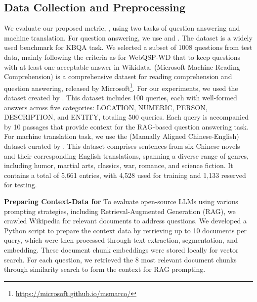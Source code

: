 \label{sub:data-col-pre}
\subsection{Data Collection and Preprocessing}
\label{sec:data}
We evaluate our proposed metric, \rap, using two tasks of question answering and machine translation. For question answering, we use \webqsp and \ms. The \textbf{\webqsp} dataset \cite{yih2016value} is a widely used benchmark for KBQA task. We selected a subset of 1008 questions from test data, mainly following the criteria as for WebQSP-WD \cite{C18-1280} that to keep questions with at least one acceptable answer in Wikidata. 
\textbf{\ms} (Microsoft Machine Reading Comprehension) is a comprehensive dataset for reading comprehension and question answering, released by Microsoft\footnote{\url{https://microsoft.github.io/msmarco/}}. For our experiments, we used the dataset created by \cite{huang2024performance}. This dataset includes 100 queries, each with well-formed answers across five categories: LOCATION, NUMERIC, PERSON, DESCRIPTION, and ENTITY, totaling 500 queries. Each query is accompanied by 10 passages that provide context for the RAG-based question answering task.
For machine translation task, we use the \textbf{\mac} (Manually Aligned Chinese-English) dataset curated by \cite{huang2025optimizing}. This dataset comprises sentences from six Chinese novels and their corresponding English translations, spanning a diverse range of genres, including humor, martial arts, classics, war, romance, and science fiction. It contains a total of 5,661 entries, with 4,528 used for training and 1,133 reserved for testing.

\noindent
\textbf{Preparing Context-Data for \webqsp} 
\label{sub:webqsp}
To evaluate open-source LLMs using various prompting strategies, including Retrieval-Augmented Generation (RAG), we crawled Wikipedia for relevant documents to address \webqsp questions. We developed a Python script to prepare the context data by retrieving up to 10 documents per query, which were then processed through text extraction, segmentation, and embedding. These document chunk embeddings were stored locally for vector search. For each question, we retrieved the 8 most relevant document chunks through similarity search to form the context for RAG prompting.

